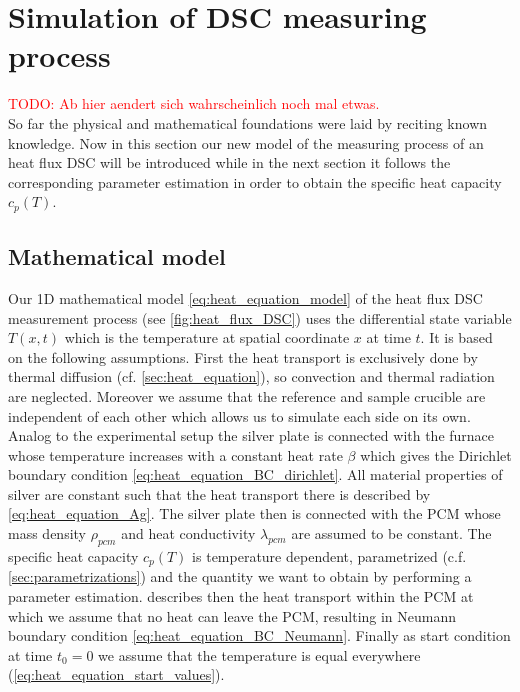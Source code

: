 \documentclass{scrartcl}[12pt, halfparskip]
\numberwithin{equation}{section}
\numberwithin{figure}{section}
\numberwithin{table}{section}
\newcommand{\todo}[1]{\textcolor{red}{TODO: #1}}
\begin{document}
\newpage
\section{Simulation of DSC measuring process}

\todo{Ab hier aendert sich wahrscheinlich noch mal etwas.} \\

So far the physical and mathematical foundations were laid by reciting known knowledge. Now in this section our new model of the measuring process of an heat flux DSC will be introduced while in the next section it follows the corresponding parameter estimation in order to obtain the specific heat capacity $c_p(T)$.



\subsection{Mathematical model}
\label{sec:mathematical_model}

Our 1D mathematical model \cref{eq:heat_equation_model} of the heat flux DSC measurement process (see \cref{fig:heat_flux_DSC}) uses the differential state variable $T(x,t)$ which is the temperature at spatial coordinate $x$ at time $t$. It is based on the following assumptions. First the heat transport is exclusively done by thermal diffusion (cf. \cref{sec:heat_equation}), so convection and thermal radiation are neglected. 
Moreover we assume that the reference and sample crucible  are independent of each other which allows us to simulate each side on its own. 
Analog to the experimental setup the silver plate is connected with the furnace whose temperature increases with a constant heat rate $\beta$ which gives the Dirichlet boundary condition \cref{eq:heat_equation_BC_dirichlet}. All material properties of silver are constant such that the heat transport there is described by \cref{eq:heat_equation_Ag}. The silver plate then is connected with the PCM whose mass density $\rho_{pcm}$ and heat conductivity $\lambda_{pcm}$ are assumed to be constant. The specific heat capacity $c_p(T)$ is temperature dependent, parametrized (c.f. \cref{sec:parametrizations}) and the quantity we want to obtain by performing a parameter estimation.  describes then the heat transport within the PCM at which we assume that no heat can leave the PCM, resulting in Neumann boundary condition \cref{eq:heat_equation_BC_Neumann}. Finally as start condition at time ${t_0 = 0}$ we assume that the temperature is equal everywhere (\cref{eq:heat_equation_start_values}).
\end{document}
